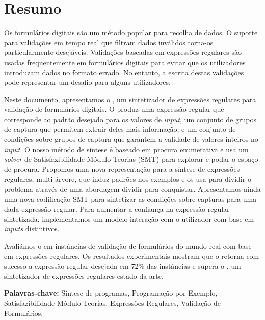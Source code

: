 \section*{Resumo}
Os formulários digitais são um método popular para recolha de dados.
O suporte para validações em tempo real que filtram dados inválidos torna-os particularmente desejáveis.
Validações baseadas em expressões regulares são usadas frequentemente em formulários digitais para evitar que os utilizadores introduzam dados no formato errado.
No entanto, a escrita destas validações pode representar um desafio para alguns utilizadores.

Neste documento, apresentamos o \Forest, um sintetizador de expressões regulares para validação de formulários digitais.
O \Forest produz uma expressão regular que corresponde ao padrão desejado para os valores de \textit{input},
um conjunto de grupos de captura que permitem extrair deles mais informação,
e
um conjunto de condições sobre grupos de captura que garantem a validade de valores inteiros no \textit{input}.
O nosso método de síntese é baseado em procura enumerativa e usa um \textit{solver} de Satisfazibilidade Módulo Teorias (SMT) para explorar e podar o espaço de procura.
Propomos uma nova representação para a síntese de expressões regulares, multi-árvore, que induz padrões nos exemplos e os usa para dividir o problema através de uma abordagem dividir para conquistar.
Apresentamos ainda uma nova codificação SMT para sintetizar as condições sobre capturas para uma dada expressão regular.
Para aumentar a confiança na expressão regular sintetizada, implementamos um modelo interação com o utilizador com base em \textit{inputs} distintivos.

Avaliámos o \Forest{} em instâncias de validação de formulários do mundo real com base em expressões regulares. Os resultados experimentais mostram que o \Forest{} retorna com sucesso a expressão regular desejada em 72\% das instâncias e supera o \Regel, um sintetizador de expressões regulares estado-da-arte.

\vfill
\noindent
\textbf{\Large Palavras-chave:} Síntese de programas, Programação-por-Exemplo, Satisfazibilidade Módulo Teorias, Expressões Regulares, Validação de Formulários.

\cleardoublepage
